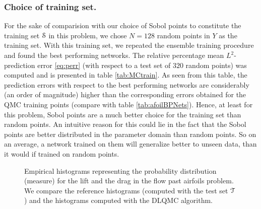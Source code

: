 \documentclass[a4paper]{article}
\numberwithin{equation}{section}
\numberwithin{equation}{section}
\theoremstyle{definition}
\theoremstyle{myremarkstyle}
\newcommand{\train}{\EuScript{S}}
\newcommand{\test}{\EuScript{T}}
\begin{document}
\subsubsection{Choice of training set.}
 For the sake of comparision with our choice of Sobol points to constitute the training set $\train$ in this problem, we chose $N=128$ random points in $Y$ as the training set.  With this training set, we repeated the ensemble training procedure and found the best performing networks. The relative percentage mean $L^2$-prediction error \eqref{eq:perr} (with respect to a test set of $320$ random points) was computed and is presented in table \ref{tab:MCtrain}. As seen from this table, the prediction errors with respect to the best performing networks are considerably (an order of magnitude) higher than the corresponding errors obtained for the QMC training points (compare with table \ref{tab:afoilBPNets}). Hence, at least for this problem, Sobol points are a much better choice for the training set than random points. An intuitive reason for this could lie in the fact that the Sobol points are better distributed in the parameter domain than random points. So on an average, a network trained on them will generalize better to unseen data, than it would if trained on random points. 
 \begin{figure}[htbp]
\caption{Empirical histograms representing the probability distribution (measure) for the lift and the drag in the flow past airfoils problem. We compare the reference histograms (computed with the test set $\test$) and the histograms computed with the DLQMC algorithm.}
\label{fig:afoilhistcomp}
\end{figure}
\end{document}

